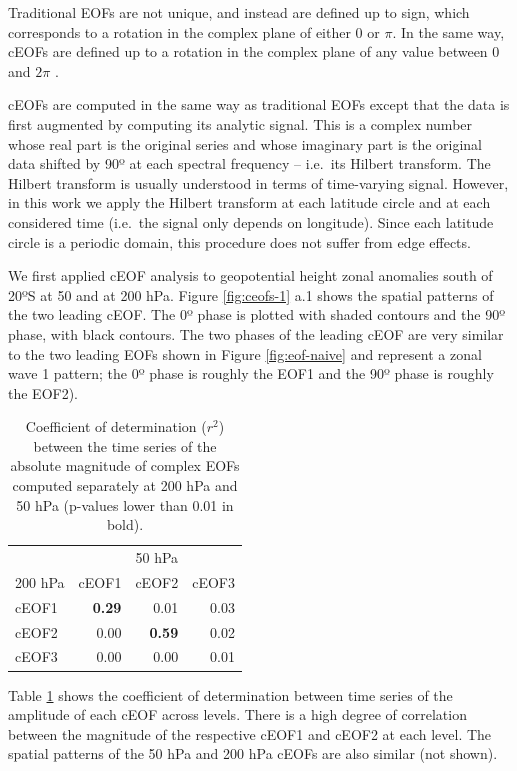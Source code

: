 \documentclass[pdflatex,lineno,sn-basic]{sn-jnl}
\theoremstyle{thmstyleone}%
\theoremstyle{thmstyletwo}%
\theoremstyle{thmstylethree}%
\begin{document}
Traditional EOFs are not unique, and instead are defined up to sign, which corresponds to a rotation in the complex plane of either 0 or \(\pi\).
In the same way, cEOFs are defined up to a rotation in the complex plane of any value between 0 and \(2\pi\) \citep{horel1984}.

cEOFs are computed in the same way as traditional EOFs except that the data is first augmented by computing its analytic signal.
This is a complex number whose real part is the original series and whose imaginary part is the original data shifted by 90º at each spectral frequency -- i.e.~its Hilbert transform.
The Hilbert transform is usually understood in terms of time-varying signal.
However, in this work we apply the Hilbert transform at each latitude circle and at each considered time (i.e.~the signal only depends on longitude).
Since each latitude circle is a periodic domain, this procedure does not suffer from edge effects.

We first applied cEOF analysis to geopotential height zonal anomalies south of 20ºS at 50 and at 200 hPa.
Figure \ref{fig:ceofs-1} a.1 shows the spatial patterns of the two leading cEOF.
The 0º phase is plotted with shaded contours and the 90º phase, with black contours.
The two phases of the leading cEOF are very similar to the two leading EOFs shown in Figure \ref{fig:eof-naive} and represent a zonal wave 1 pattern; the 0º phase is roughly the EOF1 and the 90º phase is roughly the EOF2).



\begin{table}

\caption{\label{tab:corr-ceof-splitted}Coefficient of determination (\(r^2\)) between the time series of the absolute magnitude of complex EOFs computed separately at 200 hPa and 50 hPa (p-values lower than 0.01 in bold).}
\centering
\begin{tabular}[t]{l>{}r>{}r>{}r}
\toprule
\multicolumn{1}{c}{} & \multicolumn{3}{c}{50 hPa} \\
\cmidrule(l{3pt}r{3pt}){2-4}
200 hPa & cEOF1 & cEOF2 & cEOF3\\
\midrule
cEOF1 & \textbf{0.29} & 0.01 & 0.03\\
cEOF2 & 0.00 & \textbf{0.59} & 0.02\\
cEOF3 & 0.00 & 0.00 & 0.01\\
\bottomrule
\end{tabular}
\end{table}

Table \ref{tab:corr-ceof-splitted} shows the coefficient of determination between time series of the amplitude of each cEOF across levels.
There is a high degree of correlation between the magnitude of the respective cEOF1 and cEOF2 at each level.
The spatial patterns of the 50 hPa and 200 hPa cEOFs are also similar (not shown).
\end{document}
